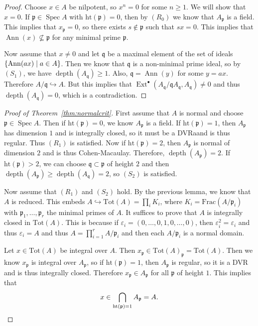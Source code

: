 \documentclass[leqno, openany]{memoir}
\theoremstyle{definition}
\theoremstyle{remark}
\theoremstyle{plain}
\theoremstyle{definition}
\theoremstyle{remark}
\newcommand{\ep}{\varepsilon}
\newcommand{\mf}[1]{\mathfrak{#1}}
\newcommand{\mr}[1]{\mathrm{#1}}
\DeclareMathOperator{\Spec}{Spec}
\DeclareMathOperator{\Ext}{Ext}
\DeclareMathOperator{\Ann}{Ann}
\DeclareMathOperator{\dpth}{depth}
\begin{document}
\begin{proof} Choose $x \in A$ be nilpotent, so $x^n = 0$ for some $n \geq 1$.
    We will show that $x = 0$. If $\mf{p} \in \Spec A$ with $\mr{ht}(\mf{p}) =
    0$, then by $(R_0)$ we know that $A_{\mf{p}}$ is a field. This implies that
    $x_{\mf{p}} = 0$, so there exists $s \notin \mf{p}$ such that $sx = 0$.
    This implies that $\Ann(x) \not\subseteq \mf{p}$ for any minimal prime
    $\mf{p}$.

    Now assume that $x \neq 0$ and let $\mf{q}$ be a maximal element of the set
of ideals $\qty{\Ann(ax) \mid a \in A}$. Then we know that $\mf{q}$ is a
non-minimal prime ideal, so by $(S_1)$, we have $\dpth(A_{\mf{q}}) \geq 1$.
Also, $\mf{q} = \Ann(y)$ for some $y = ax$. Therefore $A/\mf{q} \hookrightarrow
A$. But this implies that $\Ext^{\bullet}(A_{\mf{q}} / \mf{q} A_{\mf{q}},
A_{\mf{q}}) \neq 0$ and thus $\dpth(A_{\mf{q}}) = 0$, which is a contradiction.
\end{proof}

\begin{proof}[Proof of Theorem~\ref{thm:normalcrit}] First assume that $A$ is
    normal and choose $\mf{p} \in \Spec A$. Then if $\mr{ht}(\mf{p}) = 0$, we
    know $A_{\mf{p}}$ is a field. If $\mr{ht}(\mf{p}) = 1$, then $A_{\mf{p}}$
    has dimension $1$ and is integrally closed, so it must be a DVRaand is thus
    regular. Thus $(R_1)$ is satisfied. Now if $\mr{ht}(\mf{p}) = 2$, then
    $A_{\mf{p}}$ is normal of dimension $2$ and is thus Cohen-Macaulay.
    Therefore, $\dpth(A_{\mf{p}}) = 2$. If $\mr{ht}(\mf{p}) > 2$, we can choose
    $\mf{q} \subset \mf{p}$ of height $2$ and then $\dpth(A_{\mf{p}}) \geq
    \dpth(A_{\mf{q}}) = 2$, so $(S_2)$ is satisfied.

    Now assume that $(R_1)$ and $(S_2)$ hold. By the previous lemma, we know
    that $A$ is reduced. This embeds $A \hookrightarrow \mr{Tot}(A) = \prod_i
    K_i$, where $K_i = \mr{Frac}(A/\mf{p}_i)$ with $\mf{p}_1, \ldots, \mf{p}_r$
    the minimal primes of $A$. It suffices to prove that $A$ is integrally
    closed in $\mr{Tot}(A)$. This is because if $\ep_i = (0, \ldots, 0, 1, 0,
    \ldots, 0)$, then $\ep_i^2 = \ep_i$ and thus $\ep_i = A$ and thus $A =
    \prod_{i=1}^r A/\mf{p}_i$ and then each $A/\mf{p}_i$ is a normal domain. 

    Let $x \in \mr{Tot}(A)$ be integral over $A$. Then $x_{\mf{p}} \in
    {\mr{Tot}(A)}_{\mf{p}} = \mr{Tot}(A)$. Then we know $x_{\mf{p}}$ is
    integral over $A_{\mf{p}}$, so if $\mr{ht}(\mf{p}) = 1$, then $A_{\mf{p}}$
    is regular, so it is a DVR and is thus integrally closed. Therefore
    $x_{\mf{p}} \in A_{\mf{p}}$ for all $\mf{p}$ of height $1$. This implies
    that \[ x \in \bigcap_{\mr{ht}(\mf{p}) = 1} A_{\mf{p}} = A. \qedhere \]
\end{proof}
\end{document}
